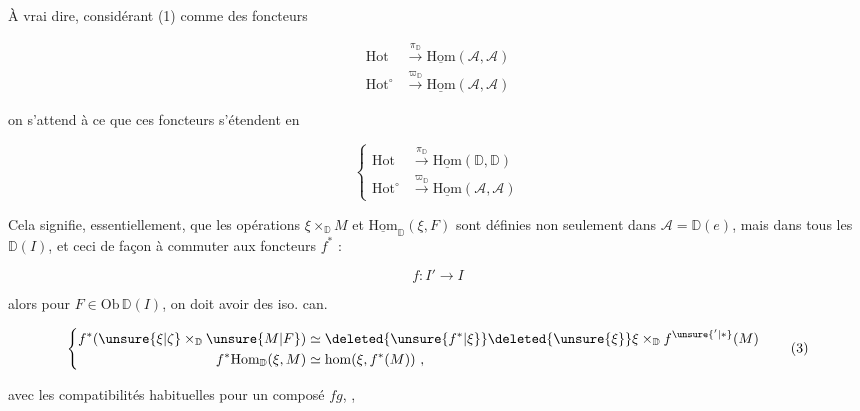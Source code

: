 
À vrai dire, considérant (1) comme des foncteurs

\[\begin{aligned}
\mathrm{Hot}&\xrightarrow{\pi_{\mathbb D}}\underline{\mathrm{Hom}}(\mathcal A,\mathcal A)\\
\mathrm{Hot}^{\circ}&\xrightarrow{\varpi_{\mathbb D}}\underline{\mathrm{Hom}}(\mathcal A,\mathcal A)
\end{aligned}\]

on s'attend à ce que ces foncteurs s'étendent en

\[
\left\{\begin{aligned}
\mathrm{Hot}&\xrightarrow{\pi_{\mathbb D}}\underline{\mathrm{Hom}}(\mathbb D,\mathbb D)\\
\mathrm{Hot}^{\circ}&\xrightarrow{\varpi_{\mathbb D}}\underline{\mathrm{Hom}}(\mathcal A,\mathcal A)
\end{aligned}\right.\tag*{(2)}
\]

Cela signifie, essentiellement, que  les opérations $\xi\times_{\mathbb D}M$ et $\underline{\mathrm{Hom}}_{\mathbb D}(\xi,F)$ sont définies non seulement dans $\mathcal A=\mathbb D(e)$, mais dans tous les $\mathbb D(I)$, et ceci de façon à commuter aux foncteurs $f^*$ :



\[f:I'\longrightarrow I\]

alors pour $F\in\mathrm{Ob}\,\mathbb D(I)$, on doit avoir des iso. can.

\[
\left\{\begin{aligned}
f^{*}(\unsure{\xi|\zeta}\times_{\mathbb D}\unsure{M|F})&\simeq
\deleted{\unsure{f^{*}|\xi}}\deleted{\unsure{\xi}}\xi\times_{\mathbb D} f^{\unsure{'|*}}(M)\\
f^{*}\mathrm{Hom}_{\mathbb D}(\xi,M)&\simeq\mathrm{hom}(\xi,f^{*}(M))\ ,
\end{aligned}\right.\tag*{(3)}
\]

avec les compatibilités habituelles pour un composé $fg$, ,

